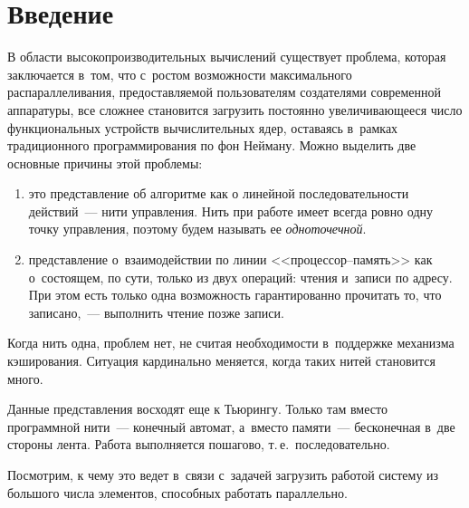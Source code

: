 





\thispagestyle{headings}

\begin{multicols}{2}

\label{st\stat}
  
\section{Введение}

  В области высокопроизводительных вычислений существует проблема, 
которая заключается в~том, что с~ростом возможности максимального 
распараллеливания, предоставляемой пользователям создателями современной 
аппаратуры, все сложнее становится загрузить постоянно увеличивающееся число 
функциональных устройств вы\-чис\-ли\-тельных ядер, оставаясь в~рамках 
традиционного программирования по фон Нейману. Можно выделить две 
основные причины этой проблемы:
 \begin{enumerate}[(1)] 
\item это представление об алгоритме как о линейной 
последовательности действий~--- нити управления. Нить при работе имеет 
всегда ровно одну точку управления, поэтому будем называть ее 
\textit{одноточечной}.
  \item представление о~взаимодействии по линии  
<<про\-цес\-сор--па\-мять>> как о~состоящем, по сути, только из двух 
операций: чтения и~записи по адресу. При этом есть только одна возможность 
гарантированно прочитать то, что записано,~--- выполнить чтение позже 
записи.
\end{enumerate}

 Когда нить одна, проблем нет, не считая необходимости в~поддержке 
механизма кэширования. Ситуация кардинально меняется, когда таких нитей 
становится много.
  
  Данные представления восходят еще к Тьюрингу. Только там вместо 
программной нити~--- конечный автомат, а~вместо памяти~--- бесконечная в~две 
стороны лента. Работа выполняется пошагово, т.\,е.\ последовательно.
  
  Посмотрим, к чему это ведет в~связи с~задачей загрузить работой систему из 
большого числа элементов, способных работать параллельно.

\begin{figure*} %
         \vspace*{1pt}
 \begin{center}
 \mbox{%
 \epsfxsize=140.218mm
 }
 \end{center}
 \vspace*{-11pt}
\end{figure*}
  

\end{multicols}
